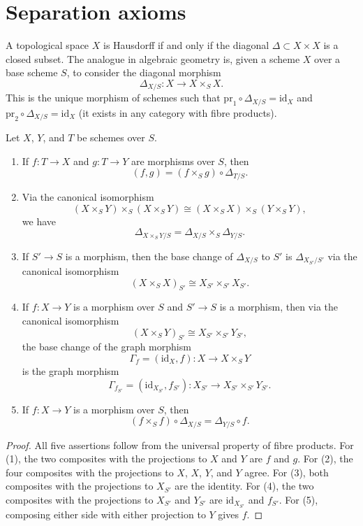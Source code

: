 \section{Separation axioms}
\label{section-separation-axioms}

\noindent
A topological space $X$ is Hausdorff if and only if the
diagonal $\Delta \subset X \times X$ is a closed subset.
The analogue in algebraic geometry is, given a scheme $X$ over
a base scheme $S$, to consider the
diagonal morphism
$$
\Delta_{X/S} : X \longrightarrow X \times_S X.
$$
This is the unique morphism of schemes such that
$\text{pr}_1 \circ \Delta_{X/S} = \text{id}_X$ and
$\text{pr}_2 \circ \Delta_{X/S} = \text{id}_X$ (it exists in
any category with fibre products).

\begin{lemma}
\label{lemma-diagonal-identities}
\begin{reference}
\cite[(5.3.1), Propositions 5.3.2 and 5.3.15, and Corollaries 5.3.4 and
5.3.12]{EGA1}
\end{reference}
Let $X$, $Y$, and $T$ be schemes over $S$.
\begin{enumerate}
\item If $f : T \to X$ and $g : T \to Y$ are morphisms over $S$, then
$$
(f, g) = (f \times_S g) \circ \Delta_{T/S}.
$$
\item Via the canonical isomorphism
$$
(X \times_S Y) \times_S (X \times_S Y) \cong
(X \times_S X) \times_S (Y \times_S Y),
$$
we have
$$
\Delta_{X \times_S Y/S} = \Delta_{X/S} \times_S \Delta_{Y/S}.
$$
\item If $S' \to S$ is a morphism, then the base change of
$\Delta_{X/S}$ to $S'$ is $\Delta_{X_{S'}/S'}$ via the canonical
isomorphism
$$
(X \times_S X)_{S'} \cong X_{S'} \times_{S'} X_{S'}.
$$
\item If $f : X \to Y$ is a morphism over $S$ and $S' \to S$ is a
morphism, then via the canonical isomorphism
$$
(X \times_S Y)_{S'} \cong X_{S'} \times_{S'} Y_{S'},
$$
the base change of the graph morphism
$$
\Gamma_f = (\text{id}_X, f) : X \longrightarrow X \times_S Y
$$
is the graph morphism
$$
\Gamma_{f_{S'}} = (\text{id}_{X_{S'}}, f_{S'}) :
X_{S'} \longrightarrow X_{S'} \times_{S'} Y_{S'}.
$$
\item If $f : X \to Y$ is a morphism over $S$, then
$$
(f \times_S f) \circ \Delta_{X/S} = \Delta_{Y/S} \circ f.
$$
\end{enumerate}
\end{lemma}

\begin{proof}
All five assertions follow from the universal property of fibre products.
For (1), the two composites with the projections to $X$ and $Y$ are $f$ and
$g$. For (2), the four composites with the projections to $X$, $X$, $Y$,
and $Y$ agree. For (3), both composites with the projections to $X_{S'}$
are the identity. For (4), the two composites with the projections to
$X_{S'}$ and $Y_{S'}$ are $\text{id}_{X_{S'}}$ and $f_{S'}$. For (5),
composing either side with either projection to $Y$ gives $f$.
\end{proof}

